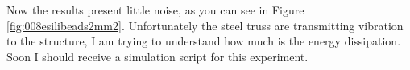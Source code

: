 Now the results present little noise, as you can see in Figure \ref{fig:008esilibeads2mm2}.
Unfortunately the steel truss are transmitting vibration to the structure, I am trying to understand how much is the energy dissipation.\\

Soon I should receive a simulation script for this experiment.\\





